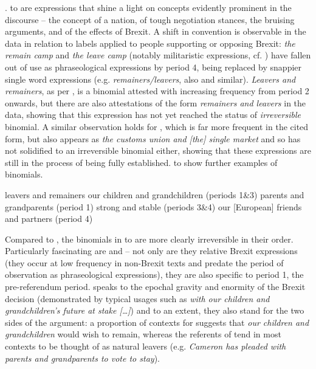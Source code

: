 \documentclass[output=paper]{langscibook}
\begin{document}
.  to  are expressions that shine a light on concepts evidently prominent in the discourse -- the concept of a nation, of tough negotiation stances, the bruising arguments, and of the effects of Brexit. A shift in convention is observable in the data in relation to labels applied to people supporting or opposing Brexit: \textit{the remain camp} and \textit{the leave camp} (notably militaristic expressions, cf. \citealt{Achilleos-SarllMartill2019}) have fallen out of use as phraseological expressions by period 4, being replaced by snappier single word expressions (e.g. \textit{remainers\slash leavers}, also  and similar). \textit{Leavers and remainers}, as per , is a binomial attested with increasing frequency from period 2 onwards, but there are also attestations of the form \textit{remainers and leavers} in the data, showing that this expression has not yet reached the status of \textit{irreversible} binomial. A similar observation holds for , which is far more frequent in the cited form, but also appears as \textit{the customs union and [the] single market} and so has not solidified to an irreversible binomial either, showing that these expressions are still in the process of being fully established.  to  show further examples of binomials.

\ea leavers and remainers\label{ex:buerki:18}
\ex our children and grandchildren (periods 1\&3)\label{ex:buerki:19}
\ex parents and grandparents (period 1)\label{ex:buerki:20}
\ex strong and stable (periods 3\&4)\label{ex:buerki:21}
\ex our [European] friends and partners (period 4)\label{ex:buerki:22}
\z

Compared to , the binomials in  to  are more clearly irreversible in their order. Particularly fascinating are  and  -- not only are they relative Brexit expressions (they occur at low frequency in non-Brexit texts and predate the period of observation as phraseological expressions), they are also specific to period 1, the pre-referendum period.  speaks to the epochal gravity and enormity of the Brexit decision (demonstrated by typical usages such as \textit{with our children and grandchildren's future at stake […]}) and to an extent, they also stand for the two sides of the argument: a proportion of contexts for  suggests that \textit{our children and grandchildren} would wish to remain, whereas the referents of  tend in most contexts to be thought of as natural leavers (e.g. \textit{Cameron has pleaded with parents and grandparents to vote to stay}).
\end{document}

